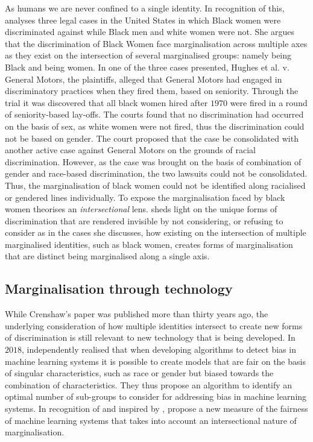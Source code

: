 As humans we are never confined to a single identity.
In recognition of this, \citet{Crenshaw:1989} analyses three legal cases in the United States in which Black women were discriminated against while Black men and white women were not.
She argues that the discrimination of Black Women face marginalisation across multiple axes as they exist on the intersection of several marginalised groups: namely being Black and being women.
In one of the three cases presented, Hughes et al. v. General Motors, the plaintiffs, alleged that General Motors had engaged in discriminatory practices when they fired them, based on seniority.
Through the trial it was discovered that all black women hired after $1970$ were fired in a round of seniority-based lay-offs. 
The courts found that no discrimination had occurred on the basis of sex, as white women were not fired, thus the discrimination could not be based on gender. 
The court proposed that the case be consolidated with another active case against General Motors on the grounds of racial discrimination. 
However, as the case was brought on the basis of combination of gender and race-based discrimination, the two lawsuits could not be consolidated. 
Thus, the marginalisation of black women could not be identified along racialised or gendered lines individually. 
To expose the marginalisation faced by black women \citet{Crenshaw:1989} theorises an \textit{intersectional} lens.
\citet{Crenshaw:1989} sheds light on the unique forms of discrimination that are rendered invisible by not considering, or refusing to consider as in the cases she discusses, how existing on the intersection of multiple marginalised identities, such as black women, creates forms of marginalisation that are distinct being marginalised along a single axis.

\subsection{Marginalisation through technology}

While Crenshaw's \citep{Crenshaw:1989} paper was published more than thirty years ago, the underlying consideration of how multiple identities intersect to create new forms of discrimination is still relevant to new technology that is being developed. 
In $2018$, \citet{Kearns:2018} independently realised that when developing algorithms to detect bias in machine learning systems it is possible to create models that are fair on the basis of singular characteristics, such as race or gender but biased towards the combination of characteristics.
They thus propose an algorithm to identify an optimal number of sub-groups to consider for addressing bias in machine learning systems. 
In recognition of \citet{Kearns:2018} and inspired by \citet{Crenshaw:1989}, \citet{Foulds:2019} propose a new measure of the fairness of machine learning systems that takes into account an intersectional nature of marginalisation.


